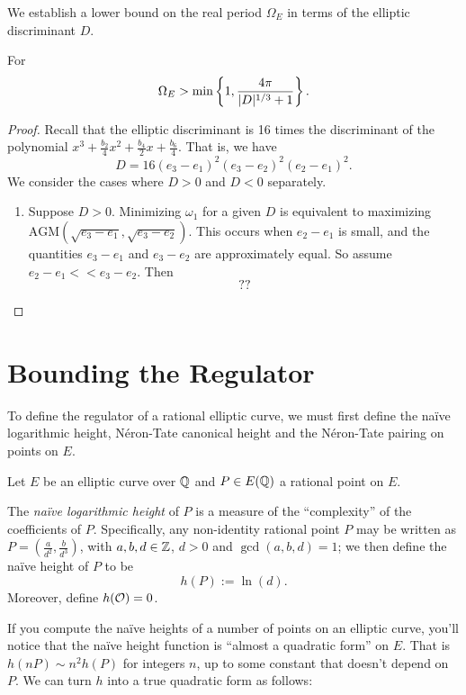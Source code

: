 \documentclass[10pt]{article}
\newcommand{\AGM}{\text{AGM}}
\begin{document}
We establish a lower bound on the real period $\Omega_E$ in terms of the elliptic discriminant $D$.
\begin{theorem}[S.]
For 
\begin{equation}
\Omega_E > \min\left\{1,\frac{4\pi}{|D|^{1/3}+1}\right\}.
\end{equation}
\end{theorem}
\begin{proof}
Recall that the elliptic discriminant is 16 times the discriminant of the polynomial $x^3 + \frac{b_2}{4} x^2 + \frac{b_4}{2} x + \frac{b_6}{4}$. That is, we have
\begin{equation}
D = 16(e_3-e_1)^2(e_3-e_2)^2(e_2-e_1)^2.
\end{equation}
We consider the cases where $D>0$ and $D<0$ separately.
\begin{enumerate}
\item Suppose $D>0$. Minimizing $\omega_1$ for a given $D$ is equivalent to maximizing $\AGM(\sqrt{e_3-e_1},\sqrt{e_3-e_2})$. This occurs when $e_2-e_1$ is small, and the quantities $e_3-e_1$ and $e_3-e_2$ are approximately equal. So assume $e_2-e_1 << e_3-e_2$. Then
\begin{equation}
??
\end{equation}
\end{enumerate}
\end{proof}


\newpage
\section{Bounding the Regulator}

To define the regulator of a rational elliptic curve, we must first define the na\"ive logarithmic height, N\'eron-Tate canonical height and the N\'eron-Tate pairing on points on $E$.

Let $E$ be an elliptic curve over $\mathbb{Q}$ and $P \in E(\mathbb{Q})$ a rational point on $E$. 

\begin{definition}
The {\it na\"ive logarithmic height} of $P$ is a measure of the ``complexity'' of the coefficients of $P$. Specifically, any non-identity rational point $P$ may be written as $P = (\frac{a}{d^2},\frac{b}{d^3})$, with $a,b,d \in \mathbb{Z}$, $d>0$ and $\gcd(a,b,d) = 1$; we then define the na\"ive height of $P$ to be
\begin{equation}
	h(P) := \ln(d).
\end{equation}
Moreover, define $h(\mathcal{O}) = 0$.
\end{definition}
If you compute the na\"ive heights of a number of points on an elliptic curve, you'll notice that the na\"ive height function is ``almost a quadratic form'' on $E$. That is $h(nP) \sim n^2 h(P)$ for integers $n$, up to some constant that doesn't depend on $P$. We can turn $h$ into a true quadratic form as follows:
\end{document}
